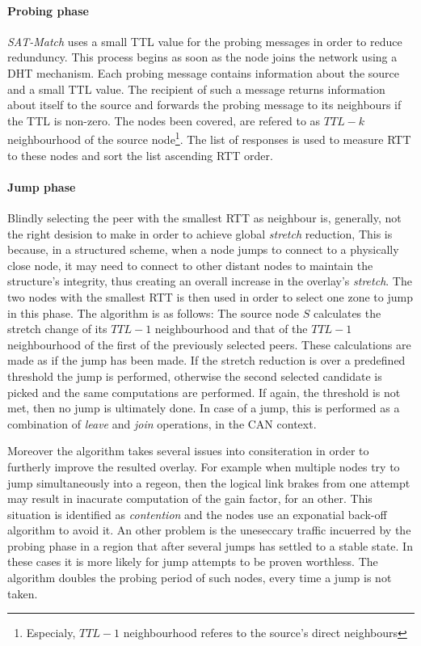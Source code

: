 \documentclass[a4paper,10pt]{article}
\begin{document}
\paragraph{Probing phase} \emph{SAT-Match} uses a small TTL value for the probing messages in order to reduce redunduncy\cite{jiang_lightflood_2008}. This process begins as soon as the node joins the network using a DHT mechanism. Each probing message contains information about the source and a small TTL value. The recipient of such a message returns information about itself to the source and forwards the probing message to its neighbours if the TTL is non-zero. The nodes been covered, are refered to as $TTL-k$ neighbourhood of the source node\footnote{Especialy, $TTL-1$ neighbourhood referes to the source's direct neighbours}. The list of responses is used to measure RTT to these nodes and sort the list ascending RTT order.

\paragraph{Jump phase} Blindly selecting the peer with the smallest RTT as neighbour is, generally, not the right desision to make in order to achieve global \emph{stretch} reduction, This is because, in a structured scheme, when a node jumps to connect to a physically close node, it may need to connect to other distant nodes to maintain the structure's integrity, thus creating an overall increase in the overlay's \emph{stretch}. The two nodes with the smallest RTT is then used in order to select one zone to jump in this phase. The algorithm is as follows: The source node $S$ calculates the stretch change of its $TTL-1$ neighbourhood and that of the $TTL-1$ neighbourhood of the first of the previously selected peers. These calculations are made as if the jump has been made. If the stretch reduction is over a predefined threshold the jump is performed, otherwise the second selected candidate is picked and the same computations are performed. If again, the threshold is not met, then no jump is ultimately done. In case of a jump, this is performed as a combination of \emph{leave} and \emph{join} operations, in the CAN context.

Moreover the algorithm takes several issues into consiteration in order to furtherly improve the resulted overlay. For example when multiple nodes try to jump simultaneously into a regeon, then the logical link brakes from one attempt may result in inacurate computation of the gain factor, for an other. This situation is identified as \emph{contention} and the nodes use an exponatial back-off algorithm to avoid it. An other problem is the uneseccary traffic incuerred by the probing phase in a region that after several jumps has settled to a stable state. In these cases it is more likely for jump attempts to be proven worthless. The algorithm doubles the probing period of such nodes, every time a jump is not taken.
\end{document}
